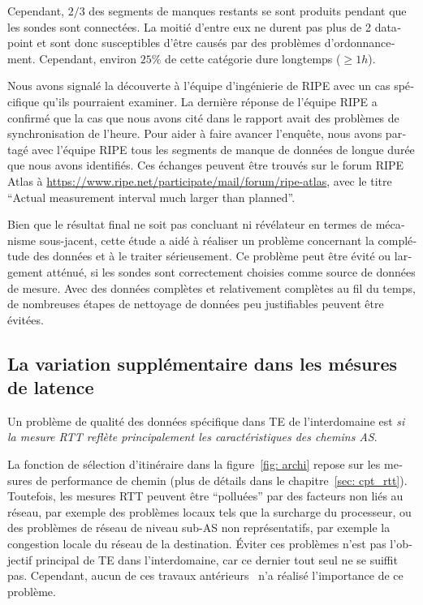 \begin{otherlanguage}{french}
Cependant, $2/3$ des segments de manques restants se sont produits pendant que les sondes sont connectées.
La moitié d'entre eux ne durent pas plus de 2 datapoint et sont donc susceptibles d'être causés par des problèmes d'ordonnancement. 
Cependant, environ $25\%$ de cette catégorie dure longtemps ($\geq 1h$).

Nous avons signalé la découverte à l'équipe d'ingénierie de RIPE avec un cas spécifique qu'ils pourraient examiner.
La dernière réponse de l'équipe RIPE a confirmé que la cas que nous avons cité dans le rapport avait des problèmes de synchronisation de l'heure. 
Pour aider à faire avancer l'enquête, nous avons partagé avec l'équipe RIPE tous les segments de manque de données de longue durée que nous avons identifiés. 
Ces échanges peuvent être trouvés sur le forum RIPE Atlas à \url{https://www.ripe.net/participate/mail/forum/ripe-atlas}, avec le titre ``Actual measurement interval much larger than planned''.

Bien que le résultat final ne soit pas concluant ni révélateur en termes de mécanisme sous-jacent, cette étude a aidé à réaliser un problème concernant la complétude des données et à le traiter sérieusement.
Ce problème peut être évité ou largement atténué, si les sondes sont correctement choisies comme source de données de mesure.
Avec des données complètes et relativement complètes au fil du temps, de nombreuses étapes de nettoyage de données peu justifiables peuvent être évitées.

\subsection{La variation supplémentaire dans les mésures de latence}

Un problème de qualité des données spécifique dans TE de l'interdomaine est \textit{si la mesure RTT reflète principalement les caractéristiques des chemins AS}.

La fonction de sélection d'itinéraire dans la figure~\ref{fig: archi} repose sur les mesures de performance de chemin (plus de détails dans le chapitre~\ref{sec: cpt_rtt}).
Toutefois, les mesures RTT peuvent être ``polluées'' par des facteurs non liés au réseau, par exemple des problèmes locaux tels que la surcharge du processeur,
 ou des problèmes de réseau de niveau sub-AS non représentatifs, par exemple la congestion locale du réseau de la destination.
Éviter ces problèmes n'est pas l'objectif principal de TE dans l'interdomaine, car ce dernier tout seul ne se suiffit pas.
Cependant, aucun de ces travaux antérieurs~\cite{Goldenberg2004, Akella2008} n'a réalisé l'importance de ce problème.


\end{otherlanguage}

